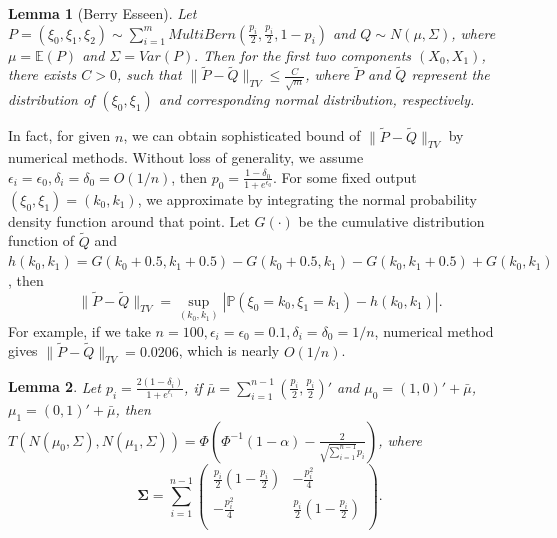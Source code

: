 \documentclass[letterpaper]{article} %
\newtheorem{lemma}{Lemma}
\begin{document}
%
%
\begin{lemma}[Berry Esseen]\label{BerryBound}
Let $P = (\xi_0,\xi_1,\xi_2) \sim  \sum_{i=1}^m MultiBern\left(\frac{p_i}{2},\frac{p_i}{2},1-p_i\right)$ and $Q \sim  N(\mu,\Sigma)$,
where $\mu = \mathbb{E}(P)$ and $\Sigma = Var(P).$ Then for the first two components $(X_0,X_1)$, there exists
$C>0$, such that $\|\tilde{P}-\tilde{Q}\|_{TV} \le \frac{C}{\sqrt{m}}$, where $\tilde{P}$ and $\tilde{Q}$ represent the distribution of $(\xi_0,\xi_1)$ and corresponding
normal distribution, respectively.
\end{lemma}

In fact, for given $n$, we can obtain sophisticated bound of $\|\tilde{P}-\tilde{Q}\|_{TV}$ by numerical methods. Without loss of generality, we assume $\epsilon_i=\epsilon_0, \delta_i = \delta_0=O(1/n)$, then
$p_0 = \frac{1-\delta_0}{1+e^{\epsilon_0}}$. For some fixed output $(\xi_0,\xi_1)=(k_0,k_1)$, we approximate by integrating the normal probability density function around that point.
Let $G(\cdot)$ be the cumulative distribution function of $\tilde{Q}$ and  $h(k_0,k_1) = G(k_0+0.5,k_1+0.5)-G(k_0+0.5,k_1)-G(k_0,k_1+0.5)+G(k_0,k_1)$, then
\begin{equation}
\|\tilde{P}-\tilde{Q}\|_{TV} = \sup_{(k_0,k_1)}|\mathbb{P}(\xi_0=k_0, \xi_1 = k_1)-h(k_0,k_1)|.
\end{equation}
For example, if we take $n=100, \epsilon_i = \epsilon_0=0.1, \delta_i = \delta_0 = 1/n$, numerical method gives $\|\tilde{P}-\tilde{Q}\|_{TV}=0.0206$, which is nearly $O(1/n)$.

\begin{lemma}\label{NormalT}
Let $p_i = \frac{2(1-\delta_i)}{1+e^{\epsilon_i}}$, if $\bar{\mu} = \sum_{i=1}^{n-1}(\frac{p_i}{2}, \frac{p_i}{2})'$ and $\mu_0 = (1,0)'+\bar{\mu}$,
$\mu_1 = (0,1)'+\bar{\mu}$, then
$T(N(\mu_0,\Sigma),N(\mu_1,\Sigma)) = \Phi(\Phi^{-1}(1-\alpha)-\frac{2}{\sqrt{\sum_{i=1}^{n-1}}p_i})$, where
$$\pmb{\Sigma} = \sum_{i=1}^{n-1} \left(
\begin{array}{cc}
\frac{p_i}{2}(1-\frac{p_i}{2}) & -\frac{p_i^2}{4} \\
-\frac{p_i^2}{4} & \frac{p_i}{2}(1-\frac{p_i}{2}) \\
\end{array}
\right).$$
\end{lemma}
\end{document}
